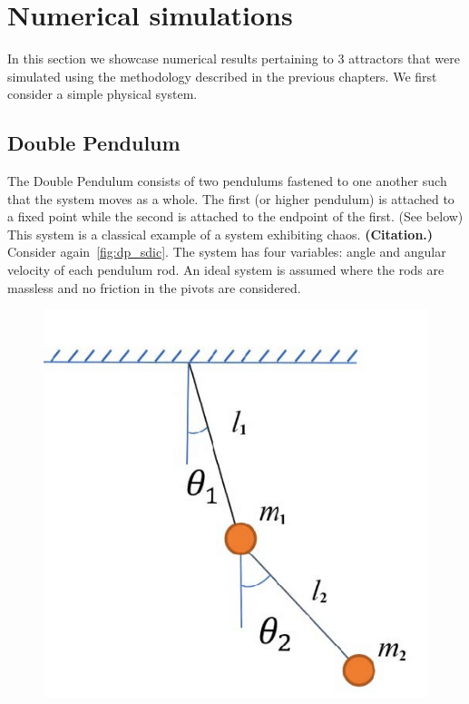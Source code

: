 \documentclass[a4paper,12pt,twoside]{report}
\begin{document}
\section{Numerical simulations}
In this section we showcase numerical results pertaining to 3 attractors that were simulated using the methodology described in the previous chapters. We first consider a simple physical system.
\subsection{Double Pendulum}

The Double Pendulum consists of two pendulums fastened to one another such that the system moves as a whole. The first (or higher pendulum) is attached to a fixed point while the second is attached to the endpoint of the first. (See below)
This system is a classical example of a system exhibiting chaos. \textbf{(Citation.)} Consider again~\ref{fig:dp_sdic}.
The system has four variables: angle and angular velocity of each pendulum rod. An ideal system is assumed where the rods are massless and no friction in the pivots are considered.

\begin{figure}[ht]
  \includegraphics[scale=0.35]{_dp_setup.png}
  \centering
  \label{fig:dp_setup}
\end{figure}
\end{document}
